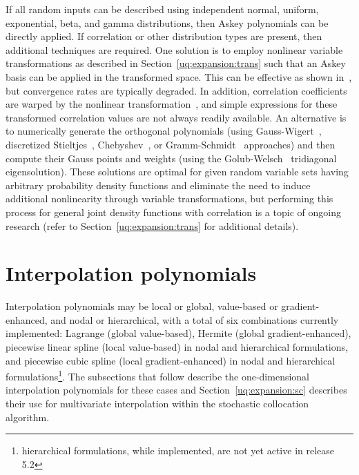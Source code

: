 If all random inputs can be described using independent normal, 
uniform, exponential, beta, and gamma distributions, then Askey 
polynomials can be directly applied.  If correlation or other distribution
types are present, then additional techniques are required.  One
solution is to employ nonlinear variable transformations as described
in Section~\ref{uq:expansion:trans} such that an Askey basis can be 
applied in the transformed space.  This can be effective as shown
in~\cite{Eld07}, but convergence rates are typically degraded.  In
addition, correlation coefficients are warped by the nonlinear
transformation~\cite{Der86}, and simple expressions for these
transformed correlation values are not always readily available.  An
alternative is to numerically generate the orthogonal polynomials
(using Gauss-Wigert~\cite{simpson_gw}, discretized
Stieltjes~\cite{gautschi_book}, Chebyshev~\cite{gautschi_book}, or
Gramm-Schmidt~\cite{WillBijl06} approaches) and then compute their
Gauss points and weights (using the Golub-Welsch~\cite{GolubWelsch69}
tridiagonal eigensolution).  These solutions are optimal for given
random variable sets having arbitrary probability density functions and 
eliminate the need to induce additional nonlinearity through variable
transformations, but performing this process for general joint density
functions with correlation is a topic of ongoing research (refer to
Section~\ref{uq:expansion:trans} for additional details).

\section{Interpolation polynomials} \label{uq:expansion:interp}

Interpolation polynomials may be local or global, value-based or
gradient-enhanced, and nodal or hierarchical, with a total of six
combinations currently implemented: Lagrange (global value-based),
Hermite (global gradient-enhanced), piecewise linear spline (local
value-based) in nodal and hierarchical formulations, and piecewise
cubic spline (local gradient-enhanced) in nodal and hierarchical
formulations\footnote{hierarchical formulations, while implemented,
  are not yet active in release 5.2}.  The subsections that follow
describe the one-dimensional interpolation polynomials for these cases
and Section~\ref{uq:expansion:sc} describes their use for multivariate
interpolation within the stochastic collocation algorithm.

